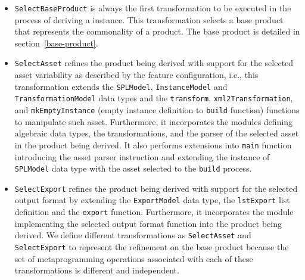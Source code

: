 \begin{itemize}
\item \texttt{SelectBaseProduct} is always the first transformation to be executed in the process of deriving a \hpl{} instance. This transformation selects a \hpl{} base product that represents the commonality of a \hpl{} product. The base product is detailed in section~\ref{base-product}.
\item \texttt{SelectAsset} refines the product being derived with support for the selected asset variability as described by the feature configuration, i.e., this transformation extends the \texttt{SPLModel}, \texttt{InstanceModel} and \texttt{TransformationModel} data types and the \texttt{transform}, \texttt{xml2Transformation}, and \texttt{mkEmptyInstance} (empty instance definition to \texttt{build} function) functions to manipulate such asset. Furthermore, it incorporates the modules defining algebraic data types, the transformations, and the parser of the selected asset in the product being derived.
It also performs extensions into \texttt{main} function introducing the asset parser instruction and extending the instance of \texttt{SPLModel} data type with the asset selected to the \texttt{build} process.
\item \texttt{SelectExport} refines the product being derived with support for the selected output format by
extending the \texttt{ExportModel} data type, the \texttt{lstExport} list definition and the \texttt{export} function. Furthermore, it incorporates the module implementing the selected output format function into the product being derived. We define different transformations as \texttt{SelectAsset} and \texttt{SelectExport} to represent the refinement on the base product because the set of metaprogramming operations associated with each of these \hpl{} transformations is different and independent.


\end{itemize}
